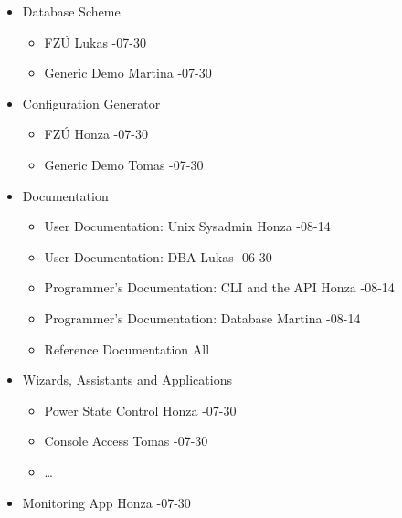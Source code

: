 \documentclass{article}
\begin{document}
\begin{itemize}
    \item Database Scheme
        \begin{itemize}
            \item FZÚ \tab Lukas -07-30
            \item Generic Demo \tab Martina -07-30
        \end{itemize}
    \item Configuration Generator
        \begin{itemize}
            \item FZÚ \tab Honza -07-30
            \item Generic Demo \tab Tomas -07-30
        \end{itemize}
    \item Documentation
        \begin{itemize}
            \item User Documentation: Unix Sysadmin \tab Honza -08-14
            \item User Documentation: DBA \tab Lukas -06-30
            \item Programmer's Documentation: CLI and the API \tab Honza -08-14
            \item Programmer's Documentation: Database \tab Martina -08-14
            \item Reference Documentation \tab All
        \end{itemize}
    \item Wizards, Assistants and Applications
        \begin{itemize}
            \item Power State Control \tab Honza -07-30
            \item Console Access \tab Tomas -07-30
            \item \ldots
        \end{itemize}
    \item Monitoring App \tab Honza -07-30
\end{itemize}
\end{document}

